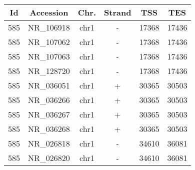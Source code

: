 \begin{tabular}{cccccc}
\hline
Id & Accession & Chr. & Strand & TSS & TES\\\hline
585 & NR\_106918 & chr1 & - & 17368 & 17436\\
585 & NR\_107062 & chr1 & - & 17368 & 17436\\
585 & NR\_107063 & chr1 & - & 17368 & 17436\\
585 & NR\_128720 & chr1 & - & 17368 & 17436\\
585 & NR\_036051 & chr1 & + & 30365 & 30503\\
585 & NR\_036266 & chr1 & + & 30365 & 30503\\
585 & NR\_036267 & chr1 & + & 30365 & 30503\\
585 & NR\_036268 & chr1 & + & 30365 & 30503\\
585 & NR\_026818 & chr1 & - & 34610 & 36081\\
585 & NR\_026820 & chr1 & - & 34610 & 36081\\\hline
\end{tabular}
